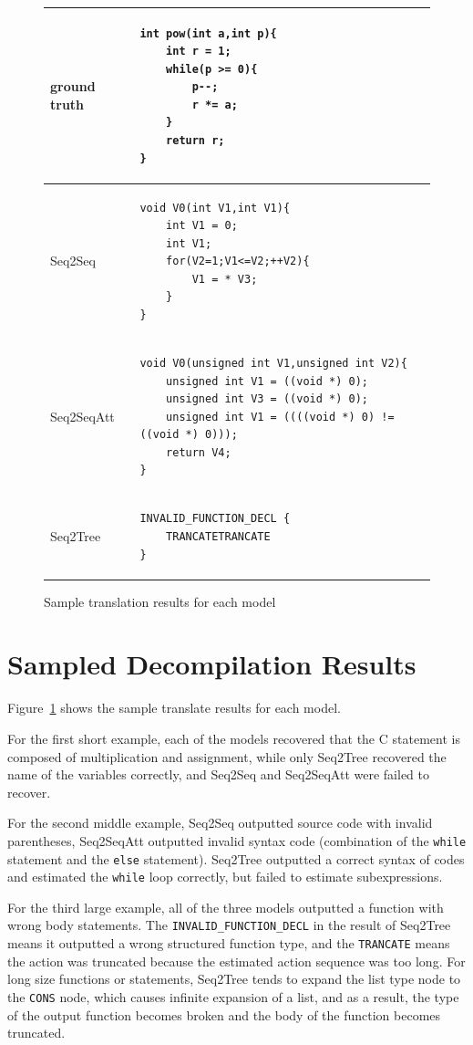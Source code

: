 \documentclass[11pt]{jarticle}
\begin{document}
\begin{figure}
\begin{tabular}{|l|l|}
	 ground truth & 
		\begin{lstlisting}[style=Csample]
int pow(int a,int p){
	int r = 1;
	while(p >= 0){
		p--;
		r *= a;
	}
	return r;
}
		\end{lstlisting} \\ \hline
		Seq2Seq & 
		\begin{lstlisting}[style=Csample]
void V0(int V1,int V1){ 
	int V1 = 0; 
	int V1; 
	for(V2=1;V1<=V2;++V2){ 
		V1 = * V3; 
	} 
}
		\end{lstlisting} \\ \hline
		Seq2SeqAtt & 
		\begin{lstlisting}[style=Csample]
void V0(unsigned int V1,unsigned int V2){ 
	unsigned int V1 = ((void *) 0); 
	unsigned int V3 = ((void *) 0); 
	unsigned int V1 = ((((void *) 0) != ((void *) 0))); 
	return V4; 
}
	\end{lstlisting} \\ \hline
		Seq2Tree & 
		\begin{lstlisting}[style=Csample]
INVALID_FUNCTION_DECL { 
	TRANCATETRANCATE 
}
		\end{lstlisting}
		 \\ \hline	
	\end{tabular}
	\caption{Sample translation results for each model}
	\label{fig:sampletranse}
\end{figure}


\section{Sampled Decompilation Results}

Figure~\ref{fig:sampletranse} shows the sample translate results for each model.

For the first short example, each of the models recovered that the C statement is composed of multiplication and assignment,
while only Seq2Tree recovered the name of the variables correctly, and Seq2Seq and Seq2SeqAtt were failed to recover.

For the second middle example, Seq2Seq outputted source code with invalid parentheses, Seq2SeqAtt outputted invalid syntax code (combination of the \texttt{while} statement and the \texttt{else} statement).
Seq2Tree outputted a correct syntax of codes and estimated the \texttt{while} loop correctly, but failed to estimate subexpressions.

For the third large example, all of the three models outputted a function with wrong body statements.
The \texttt{INVALID\_FUNCTION\_DECL} in the result of Seq2Tree means it outputted a wrong structured function type, and the \texttt{TRANCATE} means 
the action was truncated because the estimated action sequence was too long. 
For long size functions or statements, Seq2Tree tends to expand the list type node to the \texttt{CONS} node, which causes infinite expansion of a list,
and as a result, the type of the output function becomes broken and the body of the function becomes truncated.
\end{document}
